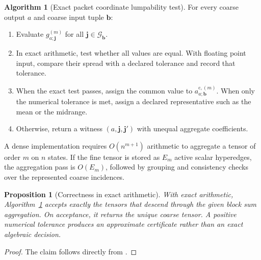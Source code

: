 \documentclass[11pt]{article}
\newtheorem{proposition}[theorem]{Proposition}
\theoremstyle{definition}
\newtheorem{algorithm}[theorem]{Algorithm}
\theoremstyle{remark}
\newcommand{\cG}{\mathcal G}
\newcommand{\coarse}{\mathrm c}
\begin{document}
\begin{algorithm}[Exact packet coordinate lumpability test]\label{alg:exact-lumpability}
For every coarse output $a$ and coarse input tuple $\mathbf b$:
\begin{enumerate}[label=\arabic*.,leftmargin=2.3em]
\item Evaluate $g^{(m)}_{a;\mathbf j}$ for all $\mathbf j\in\cG_{\mathbf b}$.
\item In exact arithmetic, test whether all values are equal.  With floating point input, compare their spread with a declared tolerance and record that tolerance.
\item When the exact test passes, assign the common value to $a^{\coarse,(m)}_{a;\mathbf b}$.  When only the numerical tolerance is met, assign a declared representative such as the mean or the midrange.
\item Otherwise, return a witness $(a,\mathbf j,\mathbf j')$ with unequal aggregate coefficients.
\end{enumerate}
\end{algorithm}

A dense implementation requires $O(n^{m+1})$ arithmetic to aggregate a tensor of order $m$ on $n$ states.  If the fine tensor is stored as $E_m$ active scalar hyperedges, the aggregation pass is $O(E_m)$, followed by grouping and consistency checks over the represented coarse incidences.

\begin{proposition}[Correctness in exact arithmetic]\label{prop:algorithm-correctness}
With exact arithmetic, Algorithm~\ref{alg:exact-lumpability} accepts exactly the tensors that descend through the given block sum aggregation.  On acceptance, it returns the unique coarse tensor.  A positive numerical tolerance produces an approximate certificate rather than an exact algebraic decision.
\end{proposition}

\begin{proof}
The claim follows directly from .
\end{proof}
\end{document}
